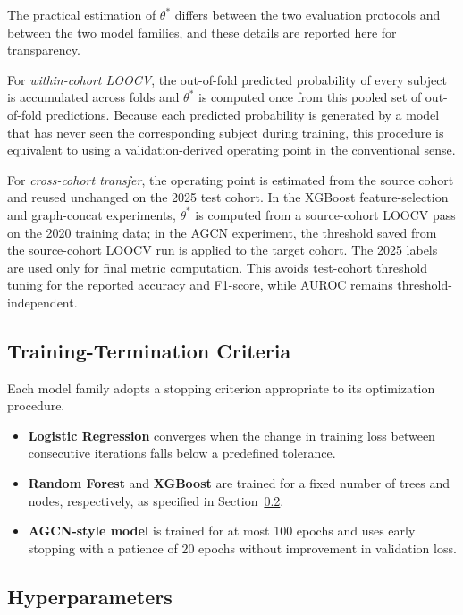 The practical estimation of $\theta^{*}$ differs between the two evaluation protocols and between the two model families, and these details are reported here for transparency.

For \emph{within-cohort LOOCV}, the out-of-fold predicted probability of every subject is accumulated across folds and $\theta^{*}$ is computed once from this pooled set of out-of-fold predictions. Because each predicted probability is generated by a model that has never seen the corresponding subject during training, this procedure is equivalent to using a validation-derived operating point in the conventional sense.

For \emph{cross-cohort transfer}, the operating point is estimated from the source cohort and reused unchanged on the 2025 test cohort. In the XGBoost feature-selection and graph-concat experiments, $\theta^{*}$ is computed from a source-cohort LOOCV pass on the 2020 training data; in the AGCN experiment, the threshold saved from the source-cohort LOOCV run is applied to the target cohort. The 2025 labels are used only for final metric computation. This avoids test-cohort threshold tuning for the reported accuracy and F1-score, while AUROC remains threshold-independent.

\subsection{Training-Termination Criteria}
\label{sec:termination}

Each model family adopts a stopping criterion appropriate to its optimization procedure.

\begin{itemize}
    \setlength{\itemsep}{0pt}
    \setlength{\parsep}{0pt}
    \setlength{\topsep}{0pt}
    \item \textbf{Logistic Regression} converges when the change in training loss between consecutive iterations falls below a predefined tolerance.
    \item \textbf{Random Forest} and \textbf{XGBoost} are trained for a fixed number of trees and nodes, respectively, as specified in Section~\ref{sec:exp_setting_hparams}.
    \item \textbf{AGCN-style model} is trained for at most 100 epochs and uses early stopping with a patience of 20 epochs without improvement in validation loss.
\end{itemize}

\subsection{Hyperparameters}
\label{sec:exp_setting_hparams}

